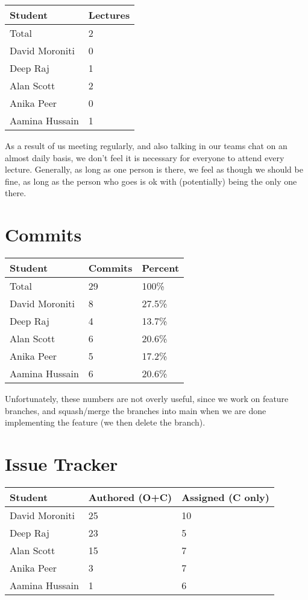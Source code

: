 \documentclass{article}
\begin{document}
\begin{table}[H]
\centering
\begin{tabular}{ll}
\toprule
\textbf{Student} & \textbf{Lectures}\\
\midrule
Total & 2\\
David Moroniti & 0\\
Deep Raj & 1\\
Alan Scott & 2\\
Anika Peer & 0\\
Aamina Hussain & 1\\
\bottomrule
\end{tabular}
\end{table}

As a result of us meeting regularly, and also talking in our teams chat on an almost daily basis, we don't feel it is necessary for 
everyone to attend every lecture. Generally, as long as one person is there, we feel as though we should be fine, as long as 
the person who goes is ok with (potentially) being the only one there.

\section{Commits}


\begin{table}[H]
\centering
\begin{tabular}{lll}
\toprule
\textbf{Student} & \textbf{Commits} & \textbf{Percent}\\
\midrule
Total & 29 & 100\% \\
David Moroniti & 8 & 27.5\% \\
Deep Raj & 4 & 13.7\% \\
Alan Scott & 6 & 20.6\% \\
Anika Peer & 5 & 17.2\% \\
Aamina Hussain & 6 & 20.6\% \\
\bottomrule
\end{tabular}
\end{table}

Unfortunately, these numbers are not overly useful, since we work on feature branches, and squash/merge the branches into main
when we are done implementing the feature (we then delete the branch).

\section{Issue Tracker}


\begin{table}[H]
\centering
\begin{tabular}{lll}
\toprule
\textbf{Student} & \textbf{Authored (O+C)} & \textbf{Assigned (C only)}\\
\midrule
David Moroniti & 25 & 10 \\
Deep Raj & 23 & 5 \\
Alan Scott & 15 & 7 \\
Anika Peer & 3 & 7 \\
Aamina Hussain & 1 & 6 \\
\bottomrule
\end{tabular}
\end{table}
\end{document}
